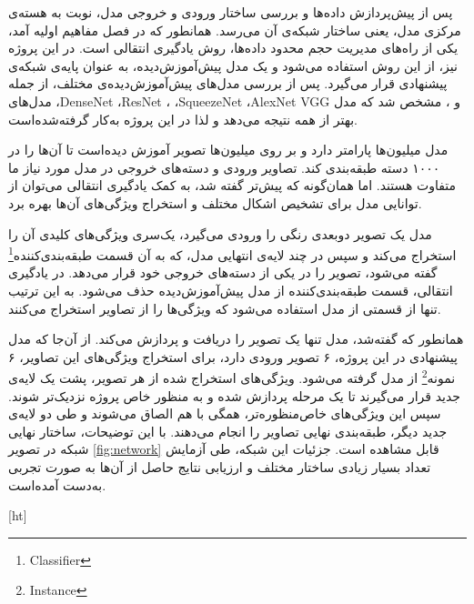 
پس از پیش‌پردازش داده‌ها و بررسی ساختار ورودی و خروجی مدل، نوبت به هسته‌ی مرکزی مدل، یعنی ساختار شبکه‌ی آن می‌رسد.
همانطور که در فصل مفاهیم اولیه آمد، یکی از راه‌های مدیریت حجم محدود داده‌ها، روش یادگیری انتقالی است.
در این پروژه نیز، از این روش استفاده می‌شود و یک مدل پیش‌آموزش‌دیده، به عنوان پایه‌ی شبکه‌ی پیشنهادی قرار می‌گیرد.
پس از بررسی مدل‌های پیش‌آموزش‌دیده‌ی مختلف، از جمله مدل‌های ،DenseNet ،ResNet ، ،SqueezeNet ،AlexNet VGG و ، مشخص شد که مدل  بهتر از همه نتیجه می‌دهد و لذا 
در این پروژه به‌کار گرفته‌شده‌است.

مدل  میلیون‌ها پارامتر دارد و بر روی میلیون‌ها تصویر آموزش دیده‌است تا آن‌ها را در ۱۰۰۰ دسته طبقه‌بندی کند.
تصاویر ورودی و دسته‌های خروجی در مدل مورد نیاز ما متفاوت هستند. اما
همان‌گونه که پیش‌تر گفته شد، به کمک یادگیری انتقالی می‌توان از توانایی مدل  برای تشخیص اشکال مختلف و استخراج ویژگی‌های آن‌ها بهره برد.

مدل  یک تصویر دو‌بعدی رنگی را ورودی می‌گیرد، یک‌سری ویژگی‌های کلیدی آن را استخراج می‌کند و 
سپس در چند لایه‌ی انتهایی مدل، که به آن قسمت 
طبقه‌بندی‌کننده\footnote{Classifier}
گفته می‌شود، تصویر را در یکی از دسته‌های خروجی خود قرار می‌دهد.
در یادگیری انتقالی، قسمت طبقه‌بندی‌کننده از مدل پیش‌آموزش‌دیده حذف می‌شود.
به این ترتیب تنها از قسمتی از مدل استفاده می‌شود که ویژگی‌ها را از تصاویر استخراج می‌کنند.

همانطور که گفته‌شد، مدل  تنها یک تصویر را دریافت و پردازش می‌کند.
از آن‌جا که مدل پیشنهادی در این پروژه، ۶ تصویر ورودی دارد، برای استخراج ویژگی‌های این تصاویر، ۶ 
نمونه\footnote{Instance}
از مدل  گرفته می‌شود.
ویژگی‌های استخراج شده از هر تصویر، پشت یک لایه‌ی 
جدید قرار می‌گیرند تا یک مرحله پردازش شده و به منظور خاص پروژه نزدیک‌تر شوند.
سپس این ویژگی‌های خاص‌منظوره‌تر، همگی با هم الصاق می‌شوند و طی دو لایه‌ی جدید دیگر، طبقه‌بندی نهایی تصاویر را انجام می‌دهند.
با این توضیحات، ساختار نهایی شبکه در تصویر \ref{fig:network}
قابل مشاهده است.
جزئیات این شبکه، 
طی آزمایش تعداد بسیار زیادی ساختار مختلف و ارزیابی نتایج حاصل از آن‌ها به صورت تجربی به‌دست آمده‌است.


[ht]


